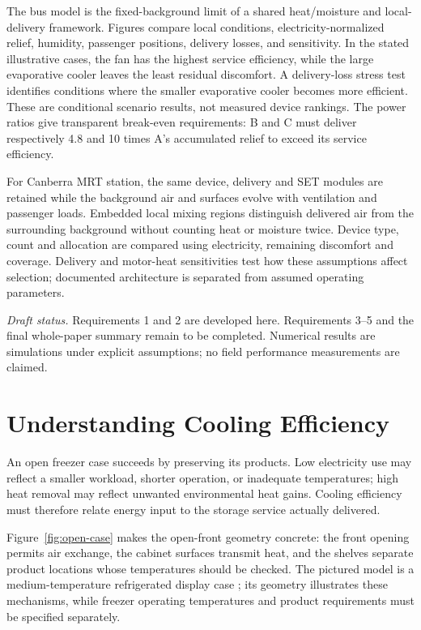\documentclass[12pt]{article}
\begin{document}
The bus model is the fixed-background limit of a shared heat/moisture and local-delivery framework. Figures compare local conditions, electricity-normalized relief, humidity, passenger positions, delivery losses, and sensitivity. In the stated illustrative cases, the fan has the highest service efficiency, while the large evaporative cooler leaves the least residual discomfort. A delivery-loss stress test identifies conditions where the smaller evaporative cooler becomes more efficient. These are conditional scenario results, not measured device rankings. The power ratios give transparent break-even requirements: B and C must deliver respectively 4.8 and 10 times A's accumulated relief to exceed its service efficiency.

For Canberra MRT station, the same device, delivery and SET modules are retained while the background air and surfaces evolve with ventilation and passenger loads. Embedded local mixing regions distinguish delivered air from the surrounding background without counting heat or moisture twice. Device type, count and allocation are compared using electricity, remaining discomfort and coverage. Delivery and motor-heat sensitivities test how these assumptions affect selection; documented architecture is separated from assumed operating parameters.

\medskip
\noindent\textit{Draft status.} Requirements 1 and 2 are developed here. Requirements 3--5 and the final whole-paper summary remain to be completed. Numerical results are simulations under explicit assumptions; no field performance measurements are claimed.

\clearpage
\pagestyle{fancy}
\tableofcontents
\clearpage

\section{Understanding Cooling Efficiency}
\label{sec:understand}

An open freezer case succeeds by preserving its products. Low electricity use may reflect a smaller workload, shorter operation, or inadequate temperatures; high heat removal may reflect unwanted environmental heat gains. Cooling efficiency must therefore relate energy input to the storage service actually delivered.


Figure~\ref{fig:open-case} makes the open-front geometry concrete: the front opening permits air exchange, the cabinet surfaces transmit heat, and the shelves separate product locations whose temperatures should be checked. The pictured model is a medium-temperature refrigerated display case \cite{hillphoenix}; its geometry illustrates these mechanisms, while freezer operating temperatures and product requirements must be specified separately.
\end{document}
